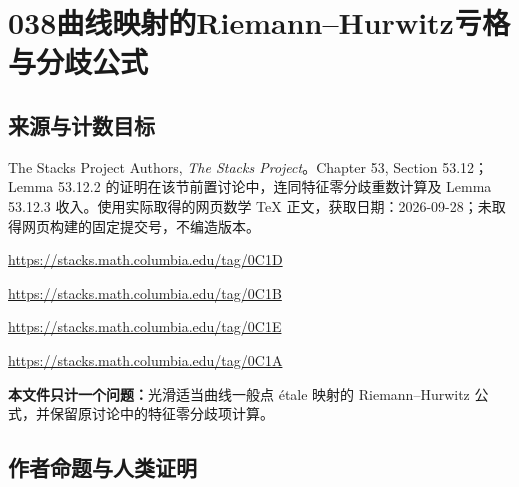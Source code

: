 \documentclass[UTF8,11pt]{ctexart}
\theoremstyle{definition}
\begin{document}
\section*{038\quad 曲线映射的Riemann--Hurwitz亏格与分歧公式}
\subsection*{来源与计数目标}
The Stacks Project Authors, \emph{The Stacks Project}。Chapter 53, Section 53.12；Lemma 53.12.2 的证明在该节前置讨论中，连同特征零分歧重数计算及 Lemma 53.12.3 收入。使用实际取得的网页数学 TeX 正文，获取日期：2026-09-28；未取得网页构建的固定提交号，不编造版本。
\par\url{https://stacks.math.columbia.edu/tag/0C1D}
\par\url{https://stacks.math.columbia.edu/tag/0C1B}
\par\url{https://stacks.math.columbia.edu/tag/0C1E}
\par\url{https://stacks.math.columbia.edu/tag/0C1A}

\par\textbf{本文件只计一个问题：}光滑适当曲线一般点 \'etale 映射的 Riemann--Hurwitz 公式，并保留原讨论中的特征零分歧项计算。
\subsection*{作者命题与人类证明}
\end{document}
